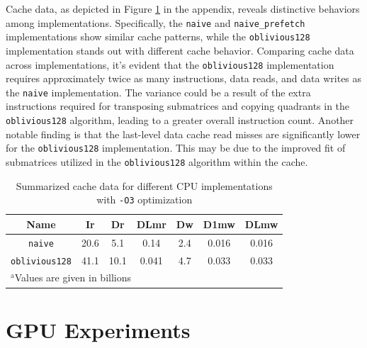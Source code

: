 \documentclass[conference]{IEEEtran}
\begin{document}
    Cache data, as depicted in Figure \ref{tab:cache_data} in the appendix, reveals distinctive behaviors among implementations. Specifically, the \texttt{naive} and \texttt{naive\_prefetch} implementations show similar cache patterns, while the \texttt{oblivious128} implementation stands out with different cache behavior. Comparing cache data across implementations, it's evident that the \texttt{oblivious128} implementation requires approximately twice as many instructions, data reads, and data writes as the \texttt{naive} implementation. The variance could be a result of the extra instructions required for transposing submatrices and copying quadrants in the \texttt{oblivious128} algorithm, leading to a greater overall instruction count. Another notable finding is that the last-level data cache read misses are significantly lower for the \texttt{oblivious128} implementation. This may be due to the improved fit of submatrices utilized in the \texttt{oblivious128} algorithm within the cache.

    \begin{table}[htbp]
        \caption{Summarized cache data for different CPU implementations with \texttt{-O3} optimization}
        \begin{center}
            \begin{tabular}{ | c | c | c | c | c | c | c |}
                \hline  
                Name                    & Ir    & Dr    & DLmr  & Dw    & D1mw  & DLmw \\
                \hline  
                \texttt{naive}          & 20.6  & 5.1   & 0.14  & 2.4   & 0.016 & 0.016\\ 
                \hline  
                \texttt{oblivious128}   & 41.1  & 10.1  & 0.041 & 4.7   & 0.033 & 0.033\\      
                \hline  
            \multicolumn{4}{l}{$^{\mathrm{a}}$Values are given in billions}     
            \end{tabular}       
        \end{center}
        \label{tab:cache_data}
    \end{table}

    \section{GPU Experiments}
\end{document}
